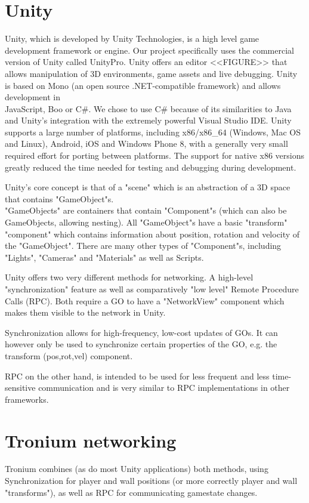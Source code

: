 \documentclass{report}
\begin{document}
\section{Unity}
Unity\textregistered, which is developed by Unity Technologies, is a high level game development framework or engine. Our project specifically uses the commercial version of Unity called Unity\textregistered Pro. Unity offers an editor  <<FIGURE>> that allows manipulation of 3D environments, game assets and live debugging.
Unity is based on Mono (an open source .NET-compatible framework) and allows development in \\ JavaScript, Boo or C\#. 
We chose to use C\# because of its similarities to Java and Unity's integration with the extremely powerful Visual Studio IDE.
Unity supports a large number of platforms, including x86/x86\_64 (Windows, Mac OS and Linux), Android, iOS and Windows Phone 8, with a generally very small required effort for porting between platforms.
The support for native x86 versions greatly reduced the time needed for testing and debugging during development.

Unity's core concept is that of a "scene" which is an abstraction of a 3D space that contains "GameObject"s.
\\ "GameObjects" are containers that contain "Component"s (which can also be GameObjects, allowing  nesting).
All "GameObject"s have a basic "transform" "component" which contains information about position, rotation and velocity of the "GameObject". There are many other types of "Component"s, including "Lights", "Cameras" and "Materials" as well as Scripts.

Unity offers two very different methods for networking.
A high-level "synchronization" feature as well as comparatively "low level"  Remote Procedure Calls (RPC).
Both require a GO to have a "NetworkView" component which makes them visible to the network in Unity.

Synchronization allows for high-frequency, low-cost updates  of GOs. It can however only be used to synchronize certain properties of the GO, e.g. the transform (pos,rot,vel) component.

RPC on the other hand, is intended to be used for less frequent and less time-sensitive communication and is very similar to RPC implementations in other frameworks.

\section{Tronium networking}
Tronium combines (as do most Unity applications) both methods, using Synchronization for player and wall positions (or more correctly player and wall "transforms"), as well as RPC for communicating gamestate changes.
\end{document}
